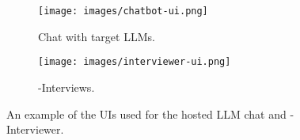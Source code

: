 \begin{figure*}[t!]
    \centering
    \begin{subfigure}[]{\linewidth}
         \texttt{[image: images/chatbot-ui.png]}
    \caption{Chat with target LLMs.}
    \label{fig:target_llm_ui}
    \end{subfigure}
        \begin{subfigure}[]{\linewidth}
         \texttt{[image: images/interviewer-ui.png]}
    \caption{\method-Interviews.}
    \label{fig:clue_interviewer_ui}
    \end{subfigure}
    \caption{An example of the UIs used for the hosted LLM chat and \method-Interviewer.}\label{fig:clue_ui}
\end{figure*}

